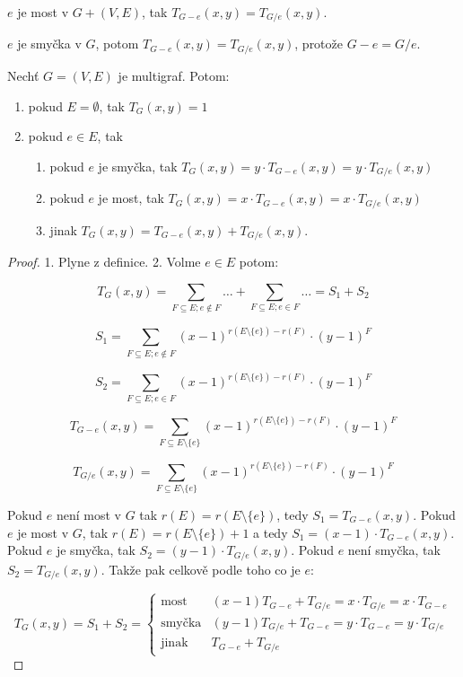 \begin{dusl}
	$e$ je most v $G+(V,E)$, tak $T_{G-e}(x,y) = T_{G/e}(x,y)$.
\end{dusl}

\begin{pozor}
	$e$ je smyčka v $G$, potom $T_{G-e}(x,y) = T_{G/e}(x,y)$, protože $G-e = G/e$.
\end{pozor}

\begin{veta}
	Nechť $G = (V,E)$ je multigraf. Potom:
	
	\begin{enumerate}
		\item pokud $E = \emptyset$, tak $T_{G}(x,y) = 1$
		\item pokud $e \in E$, tak
		\begin{enumerate}
			\item pokud $e$ je smyčka, tak $T_{G}(x,y) = y \cdot T_{G-e}(x,y) = y \cdot T_{G/e}(x,y)$
			\item pokud $e$ je most, tak $T_{G}(x,y) = x \cdot T_{G-e}(x,y) = x \cdot T_{G /e}(x,y)$
			\item jinak $T_{G}(x,y) = T_{G-e}(x,y) + T_{G/e}(x,y)$.
		\end{enumerate}
	\end{enumerate}
\end{veta}

\begin{proof}
	1. Plyne z definice. 2. Volme $e \in E$ potom:
	
	$$
	T_{G}(x,y) = \sum_{F \subseteq E; e \notin F} \dots + \sum_{F \subseteq E; e \in F} \dots = S_{1} + S_{2}
	$$
	
	$$
	S_{1} = \sum_{F \subseteq E; e \notin F}(x-1)^{r(E \setminus \{e\}) - r(F)} \cdot (y-1)^{F}
	$$
	
	$$
	S_{2} = \sum_{F \subseteq E; e \in F}(x-1)^{r(E \setminus \{e\}) - r(F)} \cdot (y-1)^{F}
	$$
	
	$$
	T_{G-e}(x,y) = \sum_{F \subseteq E \setminus \{e\}}(x-1)^{r(E \setminus \{e\}) - r(F)} \cdot (y-1)^{F}
	$$
	
	$$
	T_{G/e}(x,y) = \sum_{F \subseteq E \setminus \{e\}}(x-1)^{r(E \setminus \{e\}) - r(F)} \cdot (y-1)^{F}
	$$
	
	Pokud $e$ není most v $G$ tak $r(E) = r(E \setminus \{e\})$, tedy $S_{1} = T_{G-e}(x,y)$. Pokud $e$ je most v $G$, tak $r(E) = r(E \setminus \{e\}) + 1$ a tedy $S_{1} = (x-1) \cdot T_{G-e}(x,y)$. Pokud $e$ je smyčka, tak $S_{2} = (y-1) \cdot T_{G/e}(x,y)$. Pokud $e$ není smyčka, tak $S_{2} = T_{G/e}(x,y)$. Takže pak celkově podle toho co je $e$:
	
	$$
	T_{G}(x,y) = S_{1} + S_{2} =
	\left\{
	\begin{array}{ll}
		\text{most} & (x-1)T_{G-e} + T_{G/e} = x \cdot T_{G/e} = x \cdot T_{G-e} \\
		\text{smyčka} & (y-1)T_{G/e} + T_{G-e} = y \cdot T_{G-e} = y \cdot T_{G/e} \\
		\text{jinak} & T_{G-e} + T_{G/e}
	\end{array}
	\right.
	$$
\end{proof}

